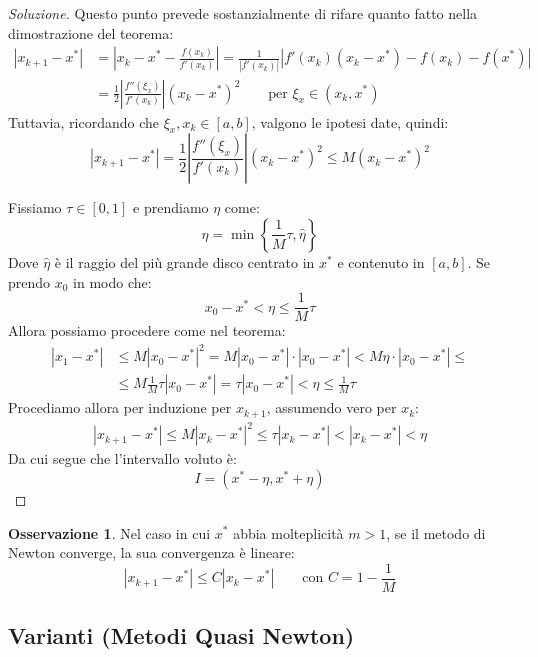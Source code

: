 \documentclass[11pt,a4paper,twoside]{article}
\theoremstyle{definition}
\newtheorem*{oss}{Osservazione}
\newenvironment{sol}
	{\renewcommand\qedsymbol{$\blacksquare$}\begin{proof}[Soluzione]}
	{\end{proof}}
\begin{document}
\begin{sol}
	 Questo punto prevede sostanzialmente di rifare quanto fatto nella dimostrazione del teorema:
	\begin{align*}
		|x_{k+1} - x^*| &= \left|x_k-x^* - \frac{f(x_k)}{f'(x_k)}\right| = \frac 1{|f'(x_k)|} |f'(x_k)(x_k-x^*) - f(x_k) - f(x^*)|\\
		&= \frac 12 \left| \frac{f''(\xi_x)}{f'(x_k)} \right|(x_k-x^*)^2 \qquad \text{per }\xi_x \in (x_k, x^*)
	\end{align*}
	Tuttavia, ricordando che $\xi_x, x_k \in [a,b]$, valgono le ipotesi date, quindi:
	\[ |x_{k+1} - x^*| = \frac 12 \left| \frac{f''(\xi_x)}{f'(x_k)} \right|(x_k-x^*)^2 \leq M(x_k-x^*)^2 \]

	 Fissiamo $\tau \in [0,1]$ e prendiamo $\eta$ come:
	\[ \eta = \min\left\{ \frac 1M \tau, \hat \eta \right\} \]
	Dove $\hat \eta$ è il raggio del più grande disco centrato in $x^*$ e contenuto in $[a,b]$. Se prendo $x_0$ in modo che:
	\[ x_0-x^* < \eta \leq \frac 1M \tau \]
	Allora possiamo procedere come nel teorema:
	\begin{align*}
		|x_1-x^*| &\leq M|x_0 -x^*|^2 = M |x_0-x^*| \cdot |x_0-x^*| < M \eta \cdot |x_0-x^*|\leq\\
		&\leq M \frac 1M \tau |x_0 - x^*| = \tau |x_0-x^*| < \eta \leq \frac 1M \tau
	\end{align*}
	Procediamo allora per induzione per $x_{k+1}$, assumendo vero per $x_k$:
	\begin{align*}
		|x_{k+1} - x^*| \leq M|x_k - x^*|^2 \leq \tau |x_k - x^*| < |x_k - x^*|< \eta
	\end{align*}
	Da cui segue che l'intervallo voluto è:
	\[ I = (x^*-\eta, x^*+\eta) \]
\end{sol}

\begin{oss}
	Nel caso in cui $x^*$ abbia molteplicità $m>1$, se il metodo di Newton converge, la sua convergenza è lineare:
	\[ |x_{k+1} - x^*| \leq C|x_k - x^*| \qquad \text{con }C = 1 - \frac 1M \]
\end{oss}

\subsection{Varianti (Metodi Quasi Newton)}
\end{document}
